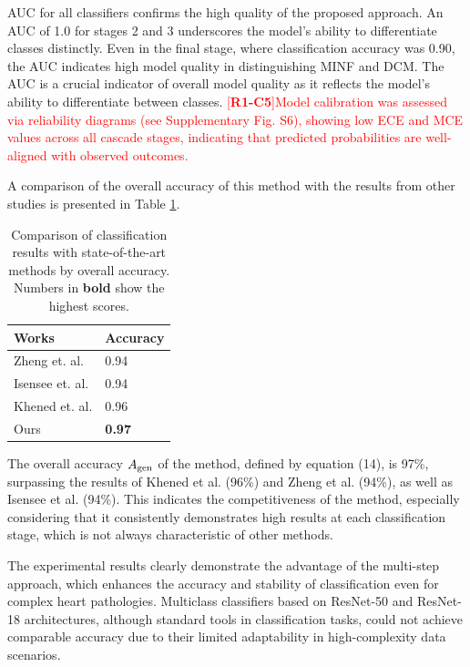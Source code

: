 \documentclass[fleqn,10pt]{wlscirep}
\newcommand{\revtag}[2]{[\textbf{R#1-C#2}]}
\newcommand{\Rone}[1]{\textcolor{red}{#1}}
\begin{document}
AUC for all classifiers confirms the high quality of the proposed approach. An AUC of 1.0 for stages 2 and 3 underscores the model’s ability to differentiate classes distinctly. Even in the final stage, where classification accuracy was 0.90, the AUC indicates high model quality in distinguishing MINF and DCM. The AUC is a crucial indicator of overall model quality as it reflects the model’s ability to differentiate between classes. \Rone{\revtag{1}{5}Model calibration was assessed via reliability diagrams (see Supplementary Fig. S6), showing low ECE and MCE values across all cascade stages, indicating that predicted probabilities are well-aligned with observed outcomes.}

A comparison of the overall accuracy of this method with the results from other studies is presented in Table \ref{tab:classification_comparison_sota}.

\begin{table}[ht]
\centering
\caption{Comparison of classification results with state-of-the-art methods by overall accuracy. Numbers in \textbf{bold} show the highest scores.}
\label{tab:classification_comparison_sota}
\begin{tabular}{ll}
\toprule
\textbf{Works} & \textbf{Accuracy} \\
\midrule
Zheng et. al. \cite{Zheng:2019} & 0.94 \\
Isensee et. al. \cite{Isensee:2018} & 0.94 \\
Khened et. al. \cite{Khened:2019} & 0.96 \\
Ours & \textbf{0.97} \\
\bottomrule
\end{tabular}
\end{table}

The overall accuracy \({A_{{\rm{gen}}}}\) of the method, defined by equation (14), is 97\%, surpassing the results of Khened et al. (96\%) and Zheng et al. (94\%), as well as Isensee et al. (94\%). This indicates the competitiveness of the method, especially considering that it consistently demonstrates high results at each classification stage, which is not always characteristic of other methods.

The experimental results clearly demonstrate the advantage of the multi-step approach, which enhances the accuracy and stability of classification even for complex heart pathologies. Multiclass classifiers based on ResNet-50 and ResNet-18 architectures, although standard tools in classification tasks, could not achieve comparable accuracy due to their limited adaptability in high-complexity data scenarios.
\end{document}
